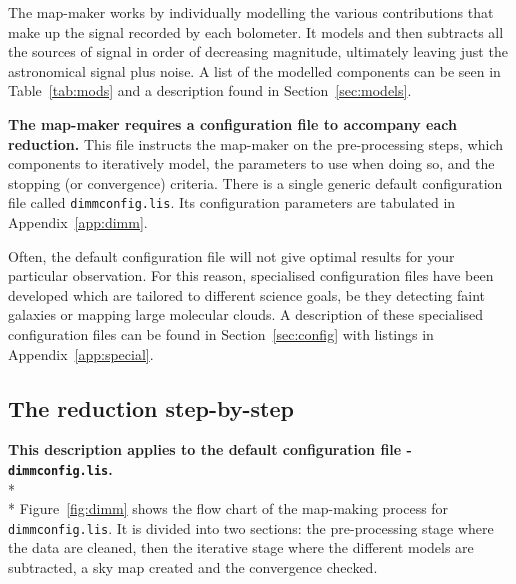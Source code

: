 \documentclass[twoside,11pt]{article}
\newcommand{\htmlref}[2]{#1}
\newcommand{\latexhtml}[2]{#1}
\renewcommand{\_}{\texttt{\symbol{95}}}
\newcommand{\file}[1]{\texttt{#1}}
\newcommand{\cref}[3]{\latexhtml{#1~\ref{#2}}{\htmlref{#3}{#2}}}
\begin{document}
The map-maker works by individually modelling the various
contributions that make up the signal recorded by each bolometer. It
models and then subtracts all the sources of signal in order of
decreasing magnitude, ultimately leaving just the astronomical signal
plus noise. A list of the modelled components can be seen in
\cref{Table}{tab:mods}{tabulated} and a description found in
\cref{Section}{sec:models}{The individual models}.

\textbf{The map-maker requires a configuration file to accompany each
reduction.} This file instructs the map-maker on the pre-processing
steps, which components to iteratively model, the parameters to use
when doing so, and the stopping (or convergence) criteria.
There is a single generic default configuration
file called \file{dimmconfig.lis}.  Its configuration parameters are
tabulated in \cref{Appendix}{app:dimm}{an appendix}.

Often, the default configuration file will not give optimal results
for your particular observation. For this reason, specialised
configuration files have been developed which are tailored to
different science goals, be they detecting faint galaxies or mapping
large molecular clouds. A
description of these specialised configuration files can be found
\cref{in Section}{sec:config}{here} with listings
\cref{in Appendix}{app:special}{this appendix}.


\subsection{The reduction step-by-step}

\textbf{This description applies to the default configuration file -
\file{dimmconfig.lis}.}\\*\\* \cref{Figure}{fig:dimm}{The graphic
below} shows the flow chart of the map-making process
for \file{dimmconfig.lis}. It is divided into two sections: the
pre-processing stage where the data are cleaned, then the iterative
stage where the different models are subtracted, a sky map created
and the convergence checked.
\end{document}
